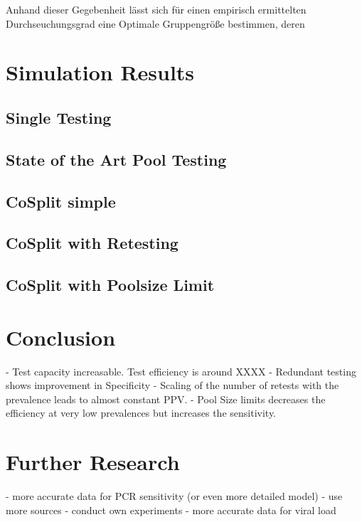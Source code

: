 \documentclass[fleqn,10pt]{wlscirep}
\begin{document}
Anhand dieser Gegebenheit lässt sich für einen empirisch ermittelten Durchseuchungsgrad eine Optimale Gruppengröße bestimmen, deren   


\section{Simulation Results}

\subsection{Single Testing}

\subsection{State of the Art Pool Testing}

\subsection{CoSplit simple}

\subsection{CoSplit with Retesting}

\subsection{CoSplit with Poolsize Limit}



\section{Conclusion}

- Test capacity increasable. Test efficiency is around XXXX %
- Redundant testing shows improvement in Specificity
- Scaling of the number of retests with the prevalence leads to almost constant PPV.
- Pool Size limits decreases the efficiency at very low prevalences but increases the sensitivity.

\section{Further Research}
- more accurate data for PCR sensitivity (or even more detailed model)
	- use more sources
	- conduct own experiments
- more accurate data for viral load
\end{document}
